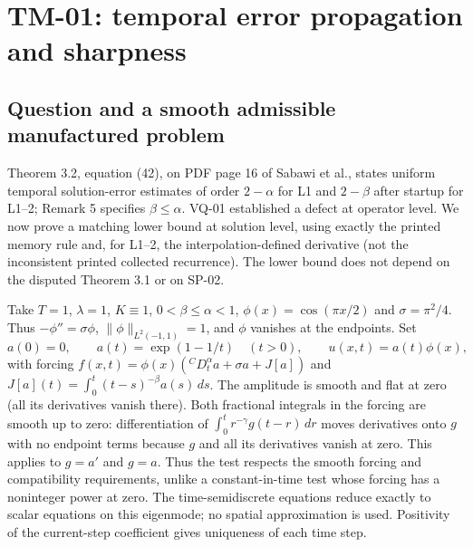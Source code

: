 \documentclass[11pt,a4paper]{amsart}
\theoremstyle{remark}
\theoremstyle{plain}
\theoremstyle{remark}
\numberwithin{equation}{section}
\begin{document}
\section{TM-01: temporal error propagation and sharpness}
\label{sec:tm01}

\subsection{Question and a smooth admissible manufactured problem}
Theorem 3.2, equation (42), on PDF page 16 of Sabawi et al., states uniform temporal solution-error estimates of order $2-\alpha$ for L1 and $2-\beta$ after startup for L1--2; Remark 5 specifies $\beta\le\alpha$. VQ-01 established a defect at operator level. We now prove a matching lower bound at solution level, using exactly the printed memory rule and, for L1--2, the interpolation-defined derivative (not the inconsistent printed collected recurrence). The lower bound does not depend on the disputed Theorem 3.1 or on SP-02.

Take $T=1$, $\lambda=1$, $K\equiv1$, $0<\beta\le\alpha<1$, $\phi(x)=\cos(\pi x/2)$ and $\sigma=\pi^2/4$. Thus $-\phi''=\sigma\phi$, $\|\phi\|_{L^2(-1,1)}=1$, and $\phi$ vanishes at the endpoints. Set
\[
 a(0)=0,\qquad a(t)=\exp(1-1/t)\quad(t>0),\qquad u(x,t)=a(t)\phi(x),
\]
with forcing $f(x,t)=\phi(x)({}^CD_t^\alpha a+\sigma a+J[a])$ and $J[a](t)=\int_0^t(t-s)^{-\beta}a(s)\,ds$. The amplitude is smooth and flat at zero (all its derivatives vanish there). Both fractional integrals in the forcing are smooth up to zero: differentiation of $\int_0^t r^{-\gamma}g(t-r)\,dr$ moves derivatives onto $g$ with no endpoint terms because $g$ and all its derivatives vanish at zero. This applies to $g=a'$ and $g=a$. Thus the test respects the smooth forcing and compatibility requirements, unlike a constant-in-time test whose forcing has a noninteger power at zero. The time-semidiscrete equations reduce exactly to scalar equations on this eigenmode; no spatial approximation is used. Positivity of the current-step coefficient gives uniqueness of each time step.
\end{document}
